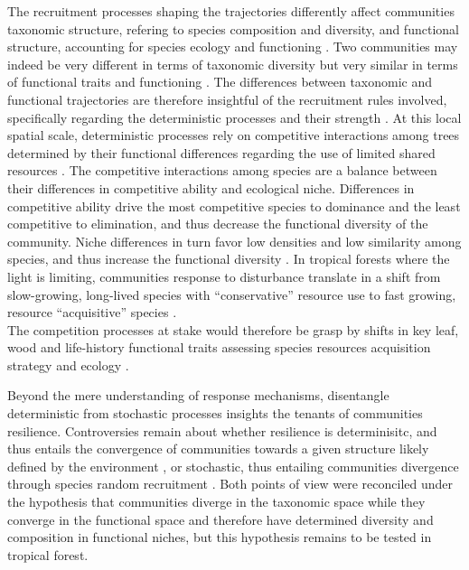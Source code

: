 \documentclass[fleqn,10pt]{ArtEcoFoG} %
\begin{document}
The recruitment processes shaping the trajectories differently affect
communities taxonomic structure, refering to species composition and
diversity, and functional structure, accounting for species ecology and
functioning \citep{Violle2007b, Kunstler2016}. Two communities may
indeed be very different in terms of taxonomic diversity but very
similar in terms of functional traits and functioning
\citep{Villeger2012}. The differences between taxonomic and functional
trajectories are therefore insightful of the recruitment rules involved,
specifically regarding the deterministic processes and their strength
\citep{Mayfield2010, Fukami2005}. At this local spatial scale,
deterministic processes rely on competitive interactions among trees
determined by their functional differences regarding the use of limited
shared resources \citep{Webb2002, Perronne2017}. The competitive
interactions among species are a balance between their differences in
competitive ability and ecological niche. Differences in competitive
ability drive the most competitive species to dominance and the least
competitive to elimination, and thus decrease the functional diversity
of the community. Niche differences in turn favor low densities and low
similarity among species, and thus increase the functional diversity
\citep{Ackerly2003, McGill2006, Kunstler2012}. In tropical forests where
the light is limiting, communities response to disturbance translate in
a shift from slow-growing, long-lived species with ``conservative''
resource use to fast growing, resource ``acquisitive'' species
\citep{Denslow1980, Molino2001, Bongers2009}.\\
The competition processes at stake would therefore be grasp by shifts in
key leaf, wood and life-history functional traits assessing species
resources acquisition strategy and ecology
\citep{Wright2004, Chave2009b, Herault2011, Gerhold2015}.

Beyond the mere understanding of response mechanisms, disentangle
deterministic from stochastic processes insights the tenants of
communities resilience. Controversies remain about whether resilience is
determinisitc, and thus entails the convergence of communities towards a
given structure likely defined by the environment \citep{Clements1916},
or stochastic, thus entailing communities divergence through species
random recruitment \citep{Diamond1975}. Both points of view were
reconciled under the hypothesis that communities diverge in the
taxonomic space while they converge in the functional space and
therefore have determined diversity and composition in functional
niches, but this hypothesis remains to be tested in tropical forest.
\end{document}
